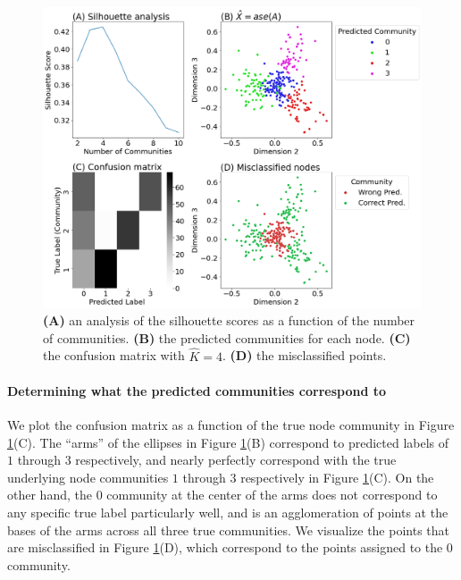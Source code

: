 \begin{figure}[h]
    \centering
    \includegraphics[width=\linewidth]{applications/ch7/Images/comm_detect_kmclust.png}
    \caption[Unsupervised community detection without knowing number of communities]{\textbf{(A)} an analysis of the silhouette scores as a function of the number of communities. \textbf{(B)} the predicted communities for each node. \textbf{(C)} the confusion matrix with $\hat K = 4$. \textbf{(D)} the misclassified points.}
    \label{fig:ch7:comm_detect:kmclust}
\end{figure}


\paragraph*{Determining what the predicted communities correspond to}

We plot the confusion matrix as a function of the true node community in Figure \ref{fig:ch7:comm_detect:kmclust}(C). The ``arms'' of the ellipses in Figure \ref{fig:ch7:comm_detect:kmclust}(B) correspond to predicted labels of $1$ through $3$ respectively, and nearly perfectly correspond with the true underlying node communities $1$ through $3$ respectively in Figure \ref{fig:ch7:comm_detect:kmclust}(C). On the other hand, the $0$ community at the center of the arms does not correspond to any specific true label particularly well, and is an agglomeration of points at the bases of the arms across all three true communities. We visualize the points that are misclassified in Figure \ref{fig:ch7:comm_detect:kmclust}(D), which correspond to the points assigned to the $0$ community. 

